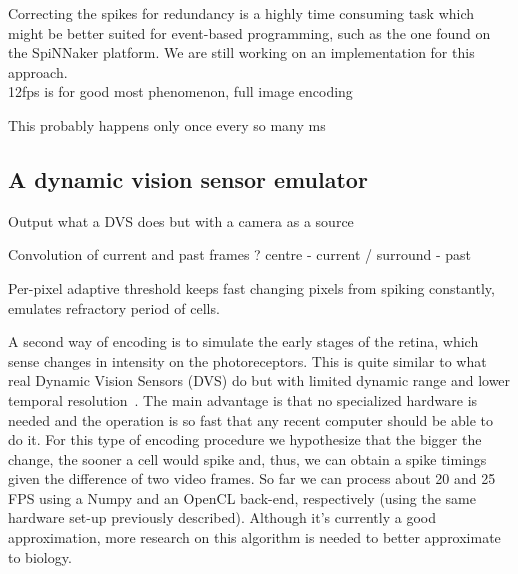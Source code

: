 Correcting the spikes for redundancy is a highly time consuming task which
might be better suited for event-based programming, such as the one found on 
the SpiNNaker platform. We are still working on an implementation for this 
approach.\\




12fps is for good most phenomenon, full image encoding

This probably happens only once every so many ms


\subsection{A dynamic vision sensor emulator}

Output what a DVS does but with a camera as a source

Convolution of current and past frames ? centre - current / surround - past

Per-pixel adaptive threshold keeps fast changing pixels from spiking constantly, emulates refractory period of cells.



A second way of encoding is to simulate the early stages of the retina, which 
sense changes in intensity on the photoreceptors. This is quite similar to what 
real Dynamic Vision Sensors (DVS) do but with limited dynamic range and lower 
temporal resolution~\cite{aer-retina-bernabe,dvs-zurich}. The main advantage is 
that no specialized hardware is needed and the operation is so fast that any 
recent computer should be able to do it. For this type of encoding procedure we 
hypothesize that the bigger the change, the sooner a cell would spike and, 
thus, we can obtain a spike timings given the difference of two video frames. 
So far we can process about 20 and 25 FPS using a Numpy and an OpenCL back-end, 
respectively (using the same hardware set-up previously described). Although 
it's currently a good approximation, more research on this algorithm is needed 
to better approximate to biology. 

